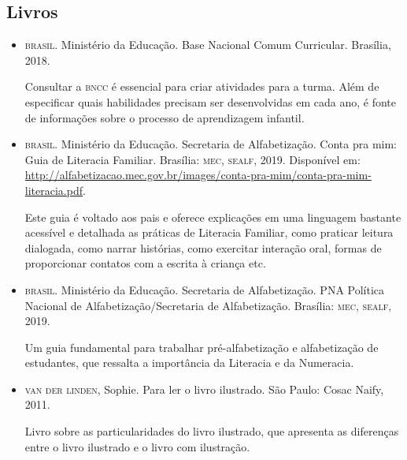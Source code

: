 \documentclass[11pt]{extarticle}
\begin{document}
\subsection{Livros}

\begin{itemize}
\item \textsc{brasil}. Ministério da Educação. Base Nacional Comum Curricular. Brasília, 2018.

Consultar a \textsc{bncc} é essencial para criar atividades para a turma. Além de especificar 
quais habilidades precisam ser desenvolvidas em cada ano, é fonte de informações sobre 
o processo de aprendizagem infantil. 

\item \textsc{brasil}. Ministério da Educação. Secretaria de Alfabetização. Conta pra mim: Guia de Literacia Familiar. 
Brasília: \textsc{mec, sealf}, 2019. Disponível em: \url{http://alfabetizacao.mec.gov.br/images/conta-pra-mim/conta-pra-mim-literacia.pdf}.

Este guia é voltado aos pais e oferece explicações em uma linguagem bastante acessível e detalhada as práticas de Literacia Familiar, 
como praticar leitura dialogada, como narrar histórias, como exercitar interação oral, formas de proporcionar contatos com a escrita à criança etc. 
 
\item \textsc{brasil}. Ministério da Educação. Secretaria de Alfabetização. PNA Política Nacional de Alfabetização/Secretaria 
de Alfabetização. Brasília: \textsc{mec, sealf}, 2019.

Um guia fundamental para trabalhar pré-alfabetização e alfabetização de estudantes, que ressalta a importância da Literacia e da Numeracia. 

\item \textsc{van der linden}, Sophie. Para ler o livro ilustrado. São Paulo: Cosac Naify, 2011.

Livro sobre as particularidades do livro ilustrado, que apresenta as diferenças entre o livro ilustrado e o livro com ilustração. 
\end{itemize}

\end{document}

